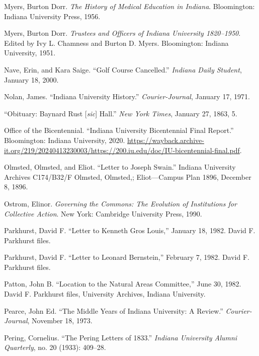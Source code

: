 \documentclass[
  american,
  letterpaper,
]{scrreprt}
\newlength{\cslhangindent}
\newenvironment{CSLReferences}[2] %
 {\begin{list}{}{%
  \setlength{\itemindent}{0pt}
  \setlength{\leftmargin}{0pt}
  \setlength{\parsep}{0pt}
  \ifodd #1
   \setlength{\leftmargin}{\cslhangindent}
   \setlength{\itemindent}{-1\cslhangindent}
  \fi
  \setlength{\itemsep}{#2\baselineskip}}}
 {\end{list}}
\begin{document}
\begin{CSLReferences}{1}{0}
Myers, Burton Dorr. \emph{The History of Medical Education in Indiana}.
Bloomington: Indiana University Press, 1956.

Myers, Burton Dorr. \emph{Trustees and Officers of Indiana University
1820--1950}. Edited by Ivy L. Chamness and Burton D. Myers. Bloomington:
Indiana University, 1951.

Nave, Erin, and Kara Saige. {``Golf Course Cancelled.''} \emph{Indiana
Daily Student}, January 18, 2000.

Nolan, James. {``Indiana University History.''} \emph{Courier-Journal},
January 17, 1971.

{``Obituary: Baynard Rust {[}\emph{{s}ic}{]} Hall.''} \emph{New York
Times}, January 27, 1863, 5.

Office of the Bicentennial. {``Indiana University Bicentennial Final
Report.''} Bloomington: Indiana University, 2020.
\url{https://wayback.archive-it.org/219/20240413230003/https://200.iu.edu/doc/IU-bicentennial-final.pdf}.

Olmsted, Olmsted, and Eliot. {``Letter to Joseph Swain.''} Indiana
University Archives C174/B32/F Olmsted, Olmsted,; Eliot---Campus Plan
1896, December 8, 1896.

Ostrom, Elinor. \emph{Governing the Commons: The Evolution of
Institutions for Collective Action}. New York: Cambridge University
Press, 1990.

Parkhurst, David F. {``Letter to Kenneth Gros Louis,''} January 18,
1982. David F. Parkhurst files.

Parkhurst, David F. {``Letter to Leonard Bernstein,''} February 7, 1982.
David F. Parkhurst files.

Patton, John B. {``Location to the Natural Areas Committee,''} June 30,
1982. David F. Parkhurst files, University Archives, Indiana University.

Pearce, John Ed. {``The Middle Years of Indiana University: A Review.''}
\emph{Courier-Journal}, November 18, 1973.

Pering, Cornelius. {``The Pering Letters of 1833.''} \emph{Indiana
University Alumni Quarterly}, no. 20 (1933): 409--28.


\end{CSLReferences}
\end{document}
